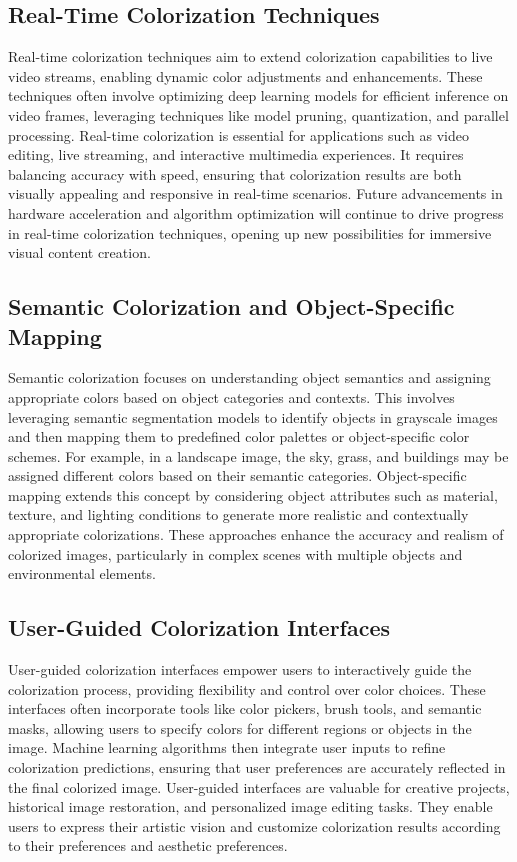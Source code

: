 \subsection*{Real-Time Colorization Techniques}

Real-time colorization techniques aim to extend colorization capabilities to live video streams, enabling dynamic color adjustments and enhancements. These techniques often involve optimizing deep learning models for efficient inference on video frames, leveraging techniques like model pruning, quantization, and parallel processing. Real-time colorization is essential for applications such as video editing, live streaming, and interactive multimedia experiences. It requires balancing accuracy with speed, ensuring that colorization results are both visually appealing and responsive in real-time scenarios. Future advancements in hardware acceleration and algorithm optimization will continue to drive progress in real-time colorization techniques, opening up new possibilities for immersive visual content creation.

\subsection*{Semantic Colorization and Object-Specific Mapping}

Semantic colorization focuses on understanding object semantics and assigning appropriate colors based on object categories and contexts. This involves leveraging semantic segmentation models to identify objects in grayscale images and then mapping them to predefined color palettes or object-specific color schemes. For example, in a landscape image, the sky, grass, and buildings may be assigned different colors based on their semantic categories. Object-specific mapping extends this concept by considering object attributes such as material, texture, and lighting conditions to generate more realistic and contextually appropriate colorizations. These approaches enhance the accuracy and realism of colorized images, particularly in complex scenes with multiple objects and environmental elements.

\subsection*{User-Guided Colorization Interfaces}

User-guided colorization interfaces empower users to interactively guide the colorization process, providing flexibility and control over color choices. These interfaces often incorporate tools like color pickers, brush tools, and semantic masks, allowing users to specify colors for different regions or objects in the image. Machine learning algorithms then integrate user inputs to refine colorization predictions, ensuring that user preferences are accurately reflected in the final colorized image. User-guided interfaces are valuable for creative projects, historical image restoration, and personalized image editing tasks. They enable users to express their artistic vision and customize colorization results according to their preferences and aesthetic preferences.

